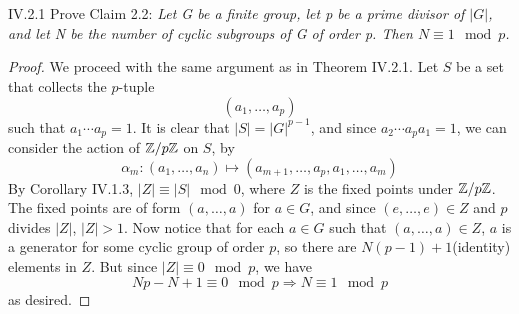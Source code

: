 \section{}

\begin{problem}{IV.2.1}
Prove Claim 2.2: 
\textit{Let G be a finite group, let p be a prime divisor of $|G|$, and let N be the number of cyclic subgroups of G of order p. Then $N \equiv 1 \mod p$.}
\end{problem}
\begin{proof}
We proceed with the same argument as in Theorem IV.2.1. Let $S$ be a set that collects the $p$-tuple
\[
(a_1,\dotsc,a_p)	
\]
such that $a_1\cdots a_p = 1$. It is clear that $|S| = |G|^{p-1}$, and since $a_2\cdots a_p a_1 = 1$, we can consider the action of $\mathbb{Z}/p\mathbb{Z}$ on $S$, by 
\[
\alpha_m : (a_1,\dotsc,a_n) \mapsto (a_{m+1},\dotsc,a_p,a_1,\dotsc,a_m)	
\]
By Corollary IV.1.3, $|Z| \equiv |S| \mod 0$, where $Z$ is the fixed points under $\mathbb{Z}/p\mathbb{Z}$. The fixed points are of form $(a,\dotsc,a)$ for $a \in G$, and since $(e,\dotsc,e) \in Z$ and $p$ divides $|Z|$, $|Z| > 1$. Now notice that for each $a \in G$ such that $(a,\dotsc,a) \in Z$, $a$ is a generator for some cyclic group of order $p$, so there are $N(p-1) + 1$(identity) elements in $Z$. But since $|Z| \equiv 0 \mod p$, we have
\[
Np - N + 1 \equiv 0 \mod p  \Longrightarrow N \equiv 1 \mod p
\]
as desired.
\end{proof}


